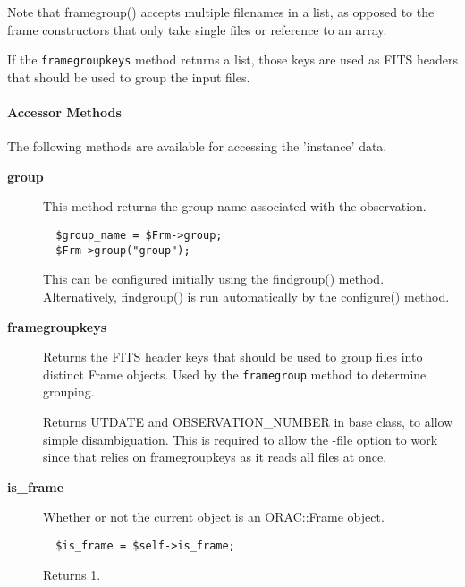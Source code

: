 \begin{description}
\begin{description}
Note that framegroup() accepts multiple filenames in a list, as opposed
to the frame constructors that only take single files or reference to
an array.



If the \texttt{framegroupkeys} method returns a list, those keys
are used as FITS headers that should be used to group the input
files.

\paragraph*{Accessor Methods\label{ORAC::Frame_Accessor_Methods}}


The following methods are available for accessing the
'instance' data.

\begin{description}

\item[{\textbf{group}}] \mbox{}

This method returns the group name associated with the observation.

\begin{verbatim}
  $group_name = $Frm->group;
  $Frm->group("group");
\end{verbatim}


This can be configured initially using the findgroup() method.
Alternatively, findgroup() is run automatically by the configure()
method.


\item[{\textbf{framegroupkeys}}] \mbox{}

Returns the FITS header keys that should be used to group
files into distinct Frame objects. Used by the \texttt{framegroup}
method to determine grouping.



Returns UTDATE and OBSERVATION\_NUMBER in base class, to allow
simple disambiguation. This is required to allow the -file
option to work since that relies on framegroupkeys as it
reads all files at once.


\item[{\textbf{is\_frame}}] \mbox{}

Whether or not the current object is an ORAC::Frame object.

\begin{verbatim}
  $is_frame = $self->is_frame;
\end{verbatim}


Returns 1.



\end{description}
\end{description}
\end{description}
